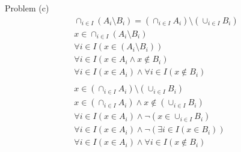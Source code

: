 \documentclass{article}
\begin{document}
Problem (c)
\begin{align*}
  \cap_{i \in I}(A_i \setminus B_i) = (\cap_{i \in I}A_i) \setminus (\cup_{i \in I}B_i)\\
  x \in \cap_{i \in I}(A_i \setminus B_i) \\
  \forall i \in I(x \in (A_i \setminus B_i)) \\
  \forall i \in I(x \in A_i \land x \notin B_i)\\
  \forall i \in I(x \in A_i) \land \forall i \in I(x \notin B_i)\\\\
  x \in (\cap_{i \in I}A_i) \setminus (\cup_{i \in I}B_i)\\
  x \in (\cap_{i \in I}A_i) \land x \notin (\cup_{i \in I}B_i) \\
  \forall i \in I(x \in A_i) \land \neg (x \in \cup_{i \in I}B_i) \\
  \forall i \in I(x \in A_i) \land \neg (\exists i \in I(x \in B_i)) \\
  \forall i \in I(x \in A_i) \land \forall i \in I (x \notin B_i)
\end{align*}
\end{document}
